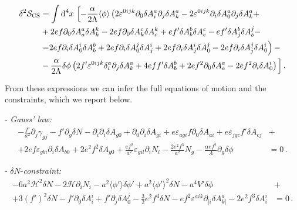 \begin{align}
\delta^2 \mathcal{S}_{\rm CS} & = \int \textrm{d}^4 x \, \left[-\frac{\alpha}{2 \Lambda} \langle \phi \rangle \left(2 \varepsilon^{0ijk} \partial_0 \delta A^a_i \partial_j \delta A^a_k- 2 \varepsilon^{0ijk} \partial_i \delta A^a_0 \partial_j \delta A^a_k+ \right.\right. \nonumber \\
& + 2 e f \partial_0 \delta A^a_a \delta A^k_k - 2ef \partial_0 \delta A^c_k \delta A^k_c+ e f' \delta A^b_b \delta A^c_c - e f' \delta A^b_j \delta A^j_b - \nonumber \\
& \left. - 2 e f \partial_i \delta A^i_0 \delta A^b_b + 2 e f \partial_i \delta A^j_0 \delta A^i_j + 2 e f \partial_i \delta A^i_j \delta A^j_0 - 2 e f \partial_i \delta A^j_j \delta A^i_0 \right) - \nonumber \\
& - \frac{\alpha}{2 \Lambda} \delta \phi \left(2 f' \varepsilon^{0ijk} \delta^a_i \partial_j \delta A^a_k + 4 e f f' \delta A^b_b + 2 e f^2 \partial_0 \delta A^a_a- 2 e f^2 \partial_i \delta A^i_0\right)\Big] \,.
\end{align}

From these expressions we can infer the full equations of motion and the constraints, which we report below.

\noindent - \textit{Gauss' law:}
\begin{align}
- \frac{f'}{a^2} \partial_j \gamma_{gj} - f' \partial_g \delta N - \partial_i \partial_i \delta A_{g0} + \partial_0 \partial_i \delta A_{gi}
+ e \varepsilon_{agi} f \partial_0 \delta A_{ai} + e \varepsilon_{jgc} f' \delta A_{cj} &+ \nonumber \\
+ 2 e f \varepsilon_{gbi} \partial_i \delta A_{b0} + 2 e^2 f^2 \delta A_{g0} 
+ \frac{e f^2}{a^2} \varepsilon_{gil} \partial_i N_l - \frac{2 e^2 f^3}{a^2} N_g  - \frac{\alpha e f^2}{\Lambda} \partial_g \delta \phi  &= 0 \,. 
\end{align}

\noindent - $\delta N$-\textit{constraint:}
\begin{align}
- 6 a^2 \mathcal{H}^2 \delta N - 2 \mathcal{H} \partial_i N_i - a^2 \langle\phi'\rangle \delta\phi' + a^2 \langle\phi'\rangle^2 \delta N - a^4 V' \delta \phi & + \nonumber \\
 + 3 \left(f'\right)^2 \delta N - f' \partial_0 \delta A^i_i + f' \partial_j \delta A^j_0 - \frac{3}{2} e^2 f^4 \delta N- e f^2 \varepsilon^{aik} \partial_{[i} \delta A^a_{k]} - 2 e^2 f^3 \delta A^i_i & = 0 \, . 
\end{align}


